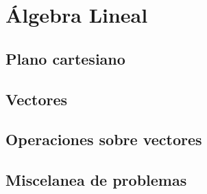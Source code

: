 \chapter{Álgebra Lineal}
\section{Plano cartesiano}
\section{Vectores}
\section{Operaciones sobre vectores}
\section{Miscelanea de problemas}
